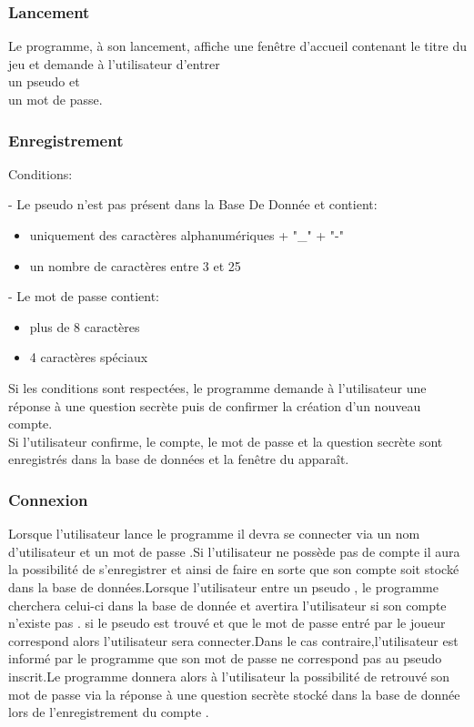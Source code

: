 \documentclass[french, utf8]{article}
\begin{document}
\subsubsection{Lancement}
\label{sec:Lancement}
Le programme, à son lancement,
affiche une fenêtre d'accueil contenant le titre du jeu et demande à l’utilisateur d'entrer
\\un pseudo et
\\un mot de passe.


\subsubsection{Enregistrement}
\label{sec:Enregistrement}

Conditions:

- Le pseudo n'est pas présent dans la Base De Donnée et contient:
\begin{itemize}
\item uniquement des caractères alphanumériques + "\_" + "-"
\item un nombre de caractères entre 3 et 25
\end{itemize}

- Le mot de passe contient:
\begin{itemize}
\item plus de 8 caractères
\item 4 caractères spéciaux
\end{itemize}

Si les conditions sont respectées, le programme
demande à l'utilisateur une réponse à une question secrète puis de confirmer la création d'un
nouveau compte.
\\Si l'utilisateur confirme, le compte, le mot de passe et la question secrète sont enregistrés dans
la base de données et la fenêtre du
 apparaît.

\subsubsection{Connexion}
\label{sec:Connexion}
Lorsque l'utilisateur lance le programme il devra se connecter via un nom d'utilisateur et un mot de passe .Si l'utilisateur ne possède pas de compte il aura la possibilité de s'enregistrer et ainsi de faire en sorte que son compte soit stocké dans la base de données.Lorsque l'utilisateur entre un pseudo , le programme cherchera celui-ci  dans la base de donnée et avertira l'utilisateur si son compte n'existe pas . si le pseudo est trouvé et que le mot de passe entré par le joueur correspond alors l'utilisateur sera connecter.Dans le cas contraire,l'utilisateur est informé par le programme que son mot de passe ne correspond pas au pseudo inscrit.Le programme donnera alors à l'utilisateur la possibilité de retrouvé son mot de passe via la réponse à une question secrète stocké dans la base de donnée lors de l'enregistrement du compte .
\end{document}
